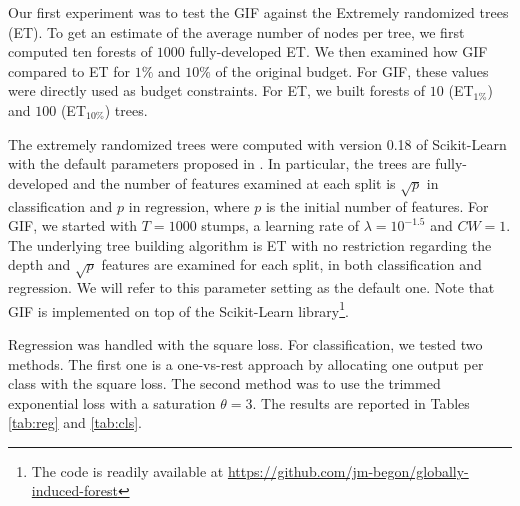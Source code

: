 \documentclass{article}
\begin{document}
Our first experiment was to test the GIF against the Extremely randomized trees 
(ET).
To get an estimate of the average number of nodes per tree, we first 
computed ten forests of $1000$ fully-developed ET. We then examined how GIF 
compared to ET for $1\%$ and $10\%$ of the original budget. For GIF, these 
values were directly used as budget constraints. For ET, we built forests of 
$10$ (ET$_{1\%}$) and $100$ (ET$_{10\%}$) trees. 

The extremely randomized trees were computed with version 0.18 of Scikit-Learn
\cite{scikit} with the default parameters proposed in \cite{extratrees}. In
particular, the trees are fully-developed and the number of features examined
at each split is $\sqrt{p}$ in classification and $p$ in regression, where $p$
is the initial number of features.  For GIF, we started with $T=1000$ stumps, a
learning rate of $\lambda = 10^{-1.5}$ and $CW=1$. The underlying tree building
algorithm is ET with no restriction regarding the depth and $\sqrt{p}$ features
are examined for each split, in both classification and regression. We will 
refer to this parameter setting as the default one.
Note that
GIF is implemented on top of the Scikit-Learn library\footnote{The code is 
readily available at \url{https://github.com/jm-begon/globally-induced-forest}}.

Regression was handled with the square loss.  For classification, we tested two
methods. The first one is a one-vs-rest approach by allocating one output per
class with the square loss. The second method was to use the trimmed
exponential loss with a saturation $\theta = 3$. The results are reported in 
Tables \ref{tab:reg} and \ref{tab:cls}.
\end{document}
